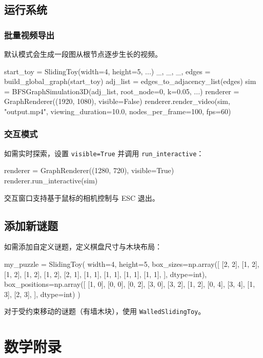 \documentclass[11pt,a4paper]{report}
\begin{document}
\section{运行系统}
\label{sec:running}
\subsection{批量视频导出}
\label{sec:batch}
默认模式会生成一段图从根节点逐步生长的视频。
\begin{pythoncode}
start_toy = SlidingToy(width=4, height=5, ...)
_, _, _, edges = build_global_graph(start_toy)
adj_list = edges_to_adjacency_list(edges)
sim = BFSGraphSimulation3D(adj_list, root_node=0, k=0.05, ...)
renderer = GraphRenderer((1920, 1080), visible=False)
renderer.render_video(sim, "output.mp4",
                       viewing_duration=10.0,
                       nodes_per_frame=100,
                       fps=60)
\end{pythoncode}
\subsection{交互模式}
\label{sec:interactive-mode}
如需实时探索，设置 \lstinline{visible=True} 并调用
\texttt{run\_interactive}：
\begin{pythoncode}
renderer = GraphRenderer((1280, 720), visible=True)
renderer.run_interactive(sim)
\end{pythoncode}
交互窗口支持基于鼠标的相机控制与 ESC 退出。
\section{添加新谜题}
\label{sec:new-puzzles}
如需添加自定义谜题，定义棋盘尺寸与木块布局：
\begin{pythoncode}
my_puzzle = SlidingToy(
    width=4, height=5,
    box_sizes=np.array([
        [2, 2], [1, 2], [1, 2], [1, 2], [1, 2],
        [2, 1], [1, 1], [1, 1], [1, 1], [1, 1],
    ], dtype=int),
    box_positions=np.array([
        [1, 0], [0, 0], [0, 2], [3, 0], [3, 2],
        [1, 2], [0, 4], [3, 4], [1, 3], [2, 3],
    ], dtype=int)
)
\end{pythoncode}
对于受约束移动的谜题（有墙木块），使用 \texttt{WalledSlidingToy}。
\chapter{数学附录}
\label{ch:appendix}
\end{document}
